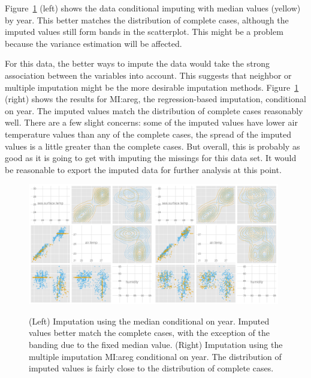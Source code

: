 \documentclass[article]{jss}
\begin{document}
Figure~\ref{fig:tao3} (left) shows the data conditional imputing with median values (yellow) by year. This better matches the distribution of complete cases, although the imputed values still form bands in the scatterplot. This might be a problem because the variance estimation will be affected. 

For this data, the better ways to impute the data would take the strong association between the variables into account. This suggests that neighbor or multiple imputation might be the more desirable imputation methods. Figure~\ref{fig:tao3} (right) shows the results for MI:areg, the regression-based imputation, conditional on year. The imputed values match the distribution of complete cases reasonably well. There are a few slight concerns: some of the imputed values have lower air temperature values than any of the complete cases, the spread of the imputed values is a little greater than the complete cases. But overall, this is probably as good as it is going to get with imputing the missings for this data set. It would be reasonable to export the imputed data for further analysis at this point.


\begin{figure}[htp]
\centerline{\includegraphics[width=0.49\textwidth]{graph/fig4-2-median-condition}\includegraphics[width=0.49\textwidth]{graph/fig4-4-areg-condition}}
\caption{(Left) Imputation using the median conditional on year. Imputed values better match the complete cases, with the exception of the banding due to the fixed median value. (Right) Imputation using the multiple imputation MI:areg conditional on year. The distribution of imputed values is fairly close to the distribution of complete cases.}
\label{fig:tao3}
\end{figure}
\end{document}
